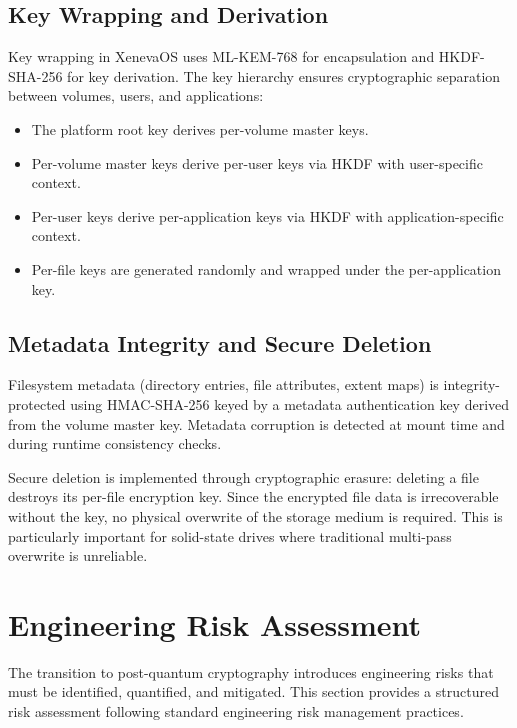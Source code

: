 \documentclass[11pt, a4paper]{article}
\begin{document}
\subsection{Key Wrapping and Derivation}\label{sec:key-wrapping}

Key wrapping in XenevaOS uses ML-KEM-768 for encapsulation and HKDF-SHA-256 for key derivation. The key hierarchy ensures cryptographic separation between volumes, users, and applications:

\begin{itemize}
    \item The platform root key derives per-volume master keys.
    \item Per-volume master keys derive per-user keys via HKDF with user-specific context.
    \item Per-user keys derive per-application keys via HKDF with application-specific context.
    \item Per-file keys are generated randomly and wrapped under the per-application key.
\end{itemize}

\subsection{Metadata Integrity and Secure Deletion}\label{sec:metadata-integrity}

Filesystem metadata (directory entries, file attributes, extent maps) is integrity-protected using HMAC-SHA-256 keyed by a metadata authentication key derived from the volume master key. Metadata corruption is detected at mount time and during runtime consistency checks.

Secure deletion is implemented through cryptographic erasure: deleting a file destroys its per-file encryption key. Since the encrypted file data is irrecoverable without the key, no physical overwrite of the storage medium is required. This is particularly important for solid-state drives where traditional multi-pass overwrite is unreliable.

\section{Engineering Risk Assessment}\label{sec:risk-assessment}

The transition to post-quantum cryptography introduces engineering risks that must be identified, quantified, and mitigated. This section provides a structured risk assessment following standard engineering risk management practices.
\end{document}
